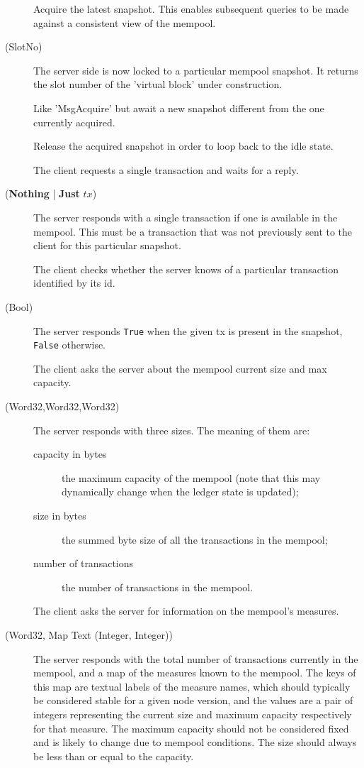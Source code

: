\begin{description}
  \item[\MsgAcquire{}] Acquire the latest snapshot. This enables subsequent
    queries to be made against a consistent view of the mempool.
  \item[\MsgAcquired{} {\boldmath (SlotNo)}] The server side is now locked to
    a particular mempool snapshot. It returns the slot number of the 'virtual
    block' under construction.
  \item[\MsgAwaitAcquire{}] Like 'MsgAcquire' but await a new snapshot
    different from the one currently acquired.
  \item[\MsgRelease{}] Release the acquired snapshot in order to loop back to
    the idle state.
  \item[\MsgNextTx{}] The client requests a single transaction and waits for
    a reply.
  \item[\MsgReplyNextTx{} \boldmath(\textbf{Nothing} | \textbf{Just} $tx$)] The
    server responds with a single transaction if one is available in the
    mempool. This must be a transaction that was not previously sent to the
    client for this particular snapshot.
  \item[\MsgHasTx{}] The client checks whether the server knows of a particular
    transaction identified by its id.
  \item[\MsgReplyHasTx{} (Bool)] The server responds \texttt{True} when the given tx
    is present in the snapshot, \texttt{False} otherwise.
  \item[\MsgGetSizes{}] The client asks the server about the mempool current
    size and max capacity.
  \item[\MsgReplyGetSizes{} (Word32,Word32,Word32)] The server responds with
    three sizes.  The meaning of them are:
    \begin{description}
      \item[capacity in bytes] the maximum capacity of the mempool {\small (note that
        this may dynamically change when the ledger state is updated)};
      \item[size in bytes] the summed byte size of all the transactions in the
        mempool;
      \item[number of transactions] the number of transactions in the mempool.
    \end{description}
  \item[\MsgGetMeasures{}] The client asks the server for information on the mempool's measures.
  \item[\MsgReplyGetMeasures{} (Word32, Map Text (Integer, Integer))] The server responds with
    the total number of transactions currently in the mempool, and a map of the measures known to
    the mempool. The keys of this map are textual labels of the measure names, which should
    typically be considered stable for a given node version, and the values are a pair of integers
    representing the current size and maximum capacity respectively for that measure. The maximum
    capacity should not be considered fixed and is likely to change due to mempool conditions. The
    size should always be less than or equal to the capacity.
\end{description}

